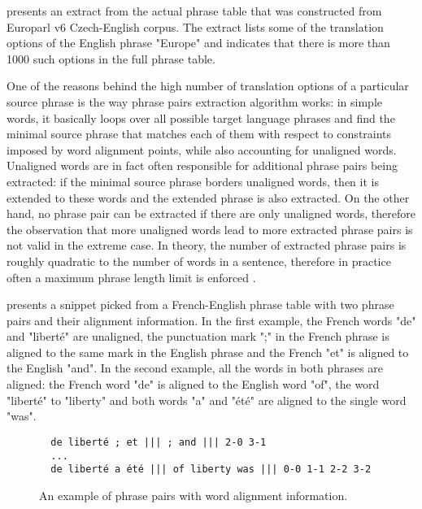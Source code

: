  presents an extract from the actual phrase table
that was constructed from Europarl v6 Czech-English corpus.
The extract lists some of the translation options of the English phrase "Europe" and
indicates that there is more than 1000 such options in the full phrase table.

One of the reasons behind the high number of translation options of a particular
source phrase is the way phrase pairs extraction algorithm works:
in simple words, it basically loops over all possible target language phrases
and find the minimal source phrase that matches each of them with respect to
constraints imposed by word alignment points, while also accounting for
unaligned words.
Unaligned words are in fact often responsible for additional phrase pairs
being extracted: if the minimal source phrase borders unaligned words,
then it is extended to these words and the extended phrase is also extracted.
On the other hand, no phrase pair can be extracted if there are only unaligned
words, therefore the observation that more unaligned words lead to more
extracted phrase pairs is not valid in the extreme case.
In theory, the number of extracted phrase pairs is roughly quadratic to the number
of words in a sentence, therefore in practice often a maximum phrase length limit
is enforced \citep[Chapter 5.2]{koehn:smt}.

 presents a snippet picked from a French-English
phrase table with two phrase pairs and their alignment information.
In the first example, the French words "de" and "liberté" are unaligned,
the punctuation mark ";" in the French phrase is aligned to the same mark in the English phrase
and the French "et" is aligned to the English "and".
In the second example, all the words in both phrases are aligned:
the French word "de" is aligned to the English word "of", the word "liberté" to "liberty"
and both words "a" and "été" are aligned to the single word "was".

\begin{figure}[ht]
\begin{verbatim}
  de liberté ; et ||| ; and ||| 2-0 3-1
  ...
  de liberté a été ||| of liberty was ||| 0-0 1-1 2-2 3-2
\end{verbatim}
\caption{\label{fig:phrase-pair-alignment}
An example of phrase pairs with word alignment information.}
\end{figure}

